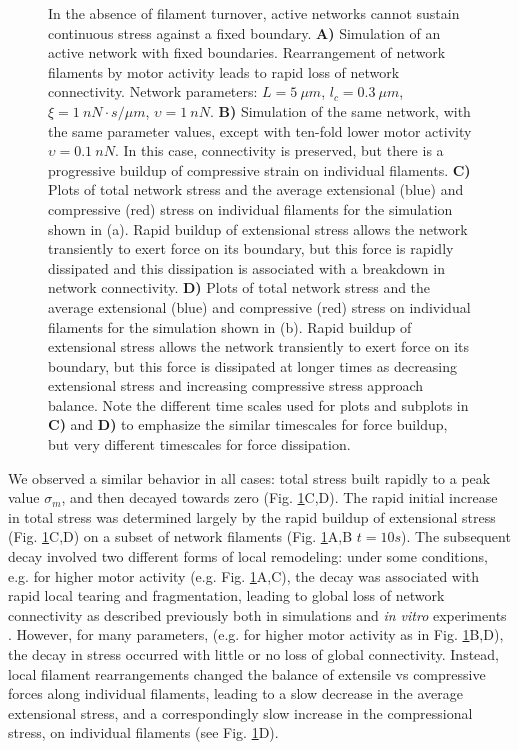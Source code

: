 \documentclass[10pt,letterpaper]{article}
\begin{document}
\begin{figure}[h!]
	\centering
	\caption{\label{fig:active_str} In the absence of filament turnover, active networks cannot sustain continuous stress against a fixed boundary.  \textbf{A)} Simulation of an active network with fixed boundaries. Rearrangement of network filaments by motor activity leads to rapid loss of network connectivity.  Network parameters: $L=5\: \mu m$, $l_c=0.3\: \mu m$, $\xi=1\: nN\cdot s/\mu m$, $\upsilon=1\: nN$.  \textbf{B)} Simulation of the same network, with the same parameter values, except with ten-fold lower motor activity $\upsilon=0.1\: nN$. In this case, connectivity is preserved, but there is a progressive buildup of compressive strain on individual filaments.  \textbf{C)} Plots of total network stress and the average extensional (blue) and compressive (red) stress on individual filaments for the simulation shown in (a). Rapid buildup of extensional stress allows the network transiently to exert force on its boundary, but this force is rapidly dissipated and this dissipation is associated with a breakdown in network connectivity.  \textbf{D)} Plots of total network stress and the average extensional (blue) and compressive (red) stress on individual filaments for the simulation shown in (b). Rapid buildup of extensional stress allows the network transiently to exert force on its boundary, but this force is dissipated at longer times as decreasing extensional stress and increasing compressive stress approach balance.  Note the different time scales used for plots and subplots in \textbf{C)} and \textbf{D)} to emphasize the similar timescales for force buildup, but very different timescales for force dissipation.}
\end{figure}

We observed a similar behavior in all cases: total stress built rapidly to a peak value $\sigma_m$, and then decayed towards zero (Fig. \ref{fig:active_str}C,D).  The rapid initial increase in total stress was determined largely by the rapid buildup of extensional stress (Fig. \ref{fig:active_str}C,D) on a subset of network filaments (Fig. \ref{fig:active_str}A,B $t=10s$). The subsequent decay involved two different forms of local remodeling: under some conditions, e.g. for higher motor activity (e.g. Fig. \ref{fig:active_str}A,C), the decay was associated with rapid local tearing and fragmentation, leading to global loss of network connectivity as described previously both in simulations\cite{Mak:2016aa} and {\em in vitro}  experiments \cite{Alvarado:2013aa}.  However, for many parameters, (e.g. for higher motor activity  as in Fig. \ref{fig:active_str}B,D), the decay in stress occurred with little or no loss of global connectivity.  Instead, local filament rearrangements changed the balance of extensile vs compressive forces along individual filaments, leading to a slow decrease in the average extensional stress, and a correspondingly slow increase in the compressional stress, on individual filaments (see Fig. \ref{fig:active_str}D).  
\end{document}
